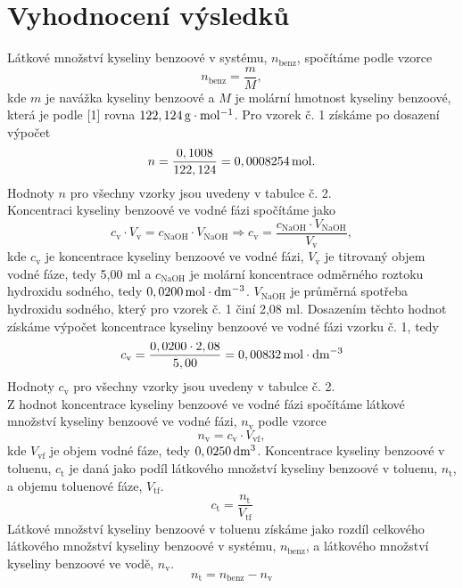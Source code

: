 \documentclass[12pt,a4paper]{article}
\def\ri#1{\mathrm{#1}}
\def\jd#1{\ifmmode\,\mathrm{#1}\else\,\textrm{#1}\fi}
\begin{document}
\section*{Vyhodnocení výsledků}	
Látkové množství kyseliny benzoové v systému, $n_\ri{benz}$, spočítáme podle vzorce
\begin{equation}
	n_\ri{benz} = \dfrac{m}{M},
\end{equation}
kde $m$ je navážka kyseliny benzoové a $M$ je molární hmotnost kyseliny benzoové, která je podle [1] rovna $122,124\jd{g\cdot mol^{-1}}$. Pro vzorek č. 1 získáme po dosazení výpočet
$$n=\dfrac{0,1008}{122,124} = 0,0008254\jd{mol}.$$
Hodnoty $n$ pro všechny vzorky jsou uvedeny v tabulce č. 2.\\
Koncentraci kyseliny benzoové ve vodné fázi spočítáme jako 
\begin{equation}
	c_\ri{v}\cdot V_\ri{v} = c_\ri{NaOH}\cdot V_\ri{NaOH} \Rightarrow c_\ri{v} = \dfrac{c_\ri{NaOH}\cdot V_\ri{NaOH}}{V_\ri{v}},
\end{equation}
kde $c_\ri{v}$ je koncentrace kyseliny benzoové ve vodné fázi, $V_\ri{v}$ je titrovaný objem vodné fáze, tedy 5,00\jd{ml} a $c_\ri{NaOH}$ je molární koncentrace odměrného roztoku hydroxidu sodného, tedy $0,0200\jd{mol\cdot dm^{-3}}$. $V_\ri{NaOH}$ je průměrná spotřeba hydroxidu sodného, který pro vzorek č. 1 činí 2,08\jd{ml}. Dosazením těchto hodnot získáme výpočet koncentrace kyseliny benzoové ve vodné fázi vzorku č. 1, tedy
$$c_\ri{v} = \dfrac{0,0200\cdot 2,08}{5,00} = 0,00832\jd{mol\cdot dm^{-3}}$$
Hodnoty $c_\ri{v}$ pro všechny vzorky jsou uvedeny v tabulce č. 2.\\
Z hodnot koncentrace kyseliny benzoové ve vodné fázi spočítáme látkové množství kyseliny benzoové ve vodné fázi, $n_\ri{v}$ podle vzorce 
\begin{equation}
	n_\ri{v} = c_\ri{v}\cdot V_\ri{vf},
\end{equation}
kde $V_\ri{vf}$ je objem vodné fáze, tedy $0,0250\jd{dm^3}$. Koncentrace kyseliny benzoové v toluenu, $c_\ri{t}$ je daná jako podíl látkového množství kyseliny benzoové v toluenu, $n_\ri{t}$, a objemu toluenové fáze, $V_\ri{tf}$.
\begin{equation}
	c_\ri{t} = \dfrac{n_\ri{t}}{V_\ri{tf}}
\end{equation}
Látkové množství kyseliny benzoové v toluenu získáme jako rozdíl celkového látkového množství kyseliny benzoové v systému, $n_\ri{benz}$, a látkového množství kyseliny benzoové ve vodě, $n_\ri{v}$.
\begin{equation}
	n_\ri{t} = n_\ri{benz} - n_\ri{v}
\end{equation}
\end{document}
